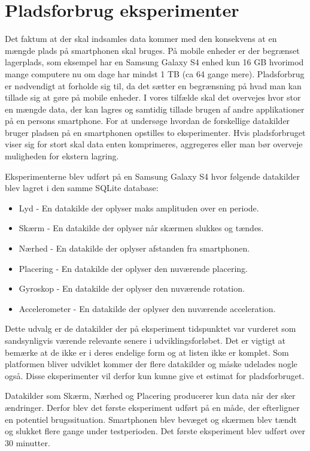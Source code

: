 \section{Pladsforbrug eksperimenter}\label{eksperimenter}
Det faktum at der skal indsamles data kommer med den konsekvens at en mængde plads på smartphonen skal bruges.
På mobile enheder er der begrænset lagerplads, som eksempel har en Samsung Galaxy S4 enhed kun 16 GB hvorimod mange computere nu om dage har mindst 1 TB (ca 64 gange mere).
Pladsforbrug er nødvendigt at forholde sig til, da det sætter en begrænsning på hvad man kan tillade sig at gøre på mobile enheder.
I vores tilfælde skal det overvejes hvor stor en mængde data, der kan lagres og samtidig tillade brugen af andre applikationer på en persons smartphone.
For at undersøge hvordan de forskellige datakilder bruger pladsen på en smartphonen opstilles to eksperimenter.
Hvis pladsforbruget viser sig for stort skal data enten komprimeres, aggregeres eller man bør overveje muligheden for ekstern lagring.

Eksperimenterne blev udført på en Samsung Galaxy S4 hvor følgende datakilder blev lagret i den samme SQLite database:

\begin{itemize}
	\item Lyd - En datakilde der oplyser maks amplituden over en periode.
	\item Skærm - En datakilde der oplyser når skærmen slukkes og tændes.
	\item Nærhed - En datakilde der oplyser afstanden fra smartphonen.
	\item Placering - En datakilde der oplyser den nuværende placering.
	\item Gyroskop - En datakilde der oplyser den nuværende rotation.
	\item Accelerometer - En datakilde der oplyser den nuværende acceleration.
\end{itemize}

Dette udvalg er de datakilder der på eksperiment tidspunktet var vurderet som sandsynligvis værende relevante senere i udviklingsforløbet.
Det er vigtigt at bemærke at de ikke er i deres endelige form og at listen ikke er komplet.
Som platformen bliver udviklet kommer der flere datakilder og måske udelades nogle også.
Disse eksperimenter vil derfor kun kunne give et estimat for pladsforbruget.

Datakilder som Skærm, Nærhed og Placering producerer kun data når der sker ændringer. 
Derfor blev det første eksperiment udført på en måde, der efterligner en potentiel brugssituation. 
Smartphonen blev bevæget og skærmen blev tændt og slukket flere gange under testperioden.
Det første eksperiment blev udført over 30 minutter.

